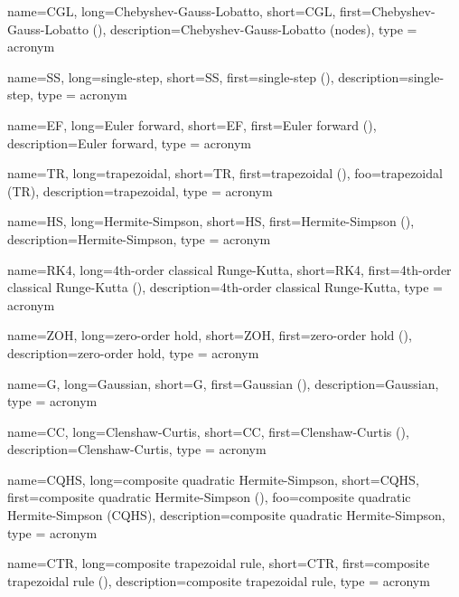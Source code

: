 {
	name={CGL},
	long={Chebyshev-Gauss-Lobatto},
	short={CGL},
	first={Chebyshev-Gauss-Lobatto ()},
	description={Chebyshev-Gauss-Lobatto (nodes)},
	type = acronym
}

{
	name={SS},
	long={single-step},
	short={SS},
	first={single-step ()},
	description={single-step},
	type = acronym
}


{
	name={EF},
	long={Euler forward},
	short={EF},
	first={Euler forward ()},
	description={Euler forward},
	type = acronym
}

{
	name={TR},
	long={trapezoidal},
	short={TR},
	first={trapezoidal ()},
	foo={trapezoidal (TR)},
	description={trapezoidal},
	type = acronym
}

{
	name={HS},
	long={Hermite-Simpson},
	short={HS},
	first={Hermite-Simpson ()},
	description={Hermite-Simpson},
	type = acronym
}

{
	name={RK4},
	long={4th-order classical Runge-Kutta},
	short={RK4},
	first={4th-order classical Runge-Kutta ()},
	description={4th-order classical Runge-Kutta},
	type = acronym
}

{
	name={ZOH},
	long={zero-order hold},
	short={ZOH},
	first={zero-order hold ()},
	description={zero-order hold},
	type = acronym
}

{
	name={G},
	long={Gaussian},
	short={G},
	first={Gaussian ()},
	description={Gaussian},
	type = acronym
}

{
	name={CC},
	long={Clenshaw-Curtis},
	short={CC},
	first={Clenshaw-Curtis ()},
	description={Clenshaw-Curtis},
	type = acronym
}

{
	name={CQHS},
	long={composite quadratic Hermite-Simpson},
	short={CQHS},
	first={composite quadratic Hermite-Simpson ()},
	foo={composite quadratic Hermite-Simpson (CQHS)},
	description={composite quadratic Hermite-Simpson},
	type = acronym
}

{
	name={CTR},
	long={composite trapezoidal rule},
	short={CTR},
	first={composite trapezoidal rule ()},
	description={composite trapezoidal rule},
	type = acronym
}

